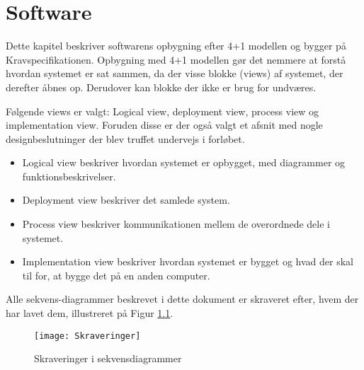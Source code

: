 \documentclass[Main]{subfiles}
\begin{document}
\chapter{Software}
Dette kapitel beskriver softwarens opbygning efter 4+1 modellen\cite[p. 872-875]{Larman} og bygger på Kravspecifikationen\cite{KravSpec}. 
Opbygning med 4+1 modellen gør det nemmere at forstå hvordan systemet er sat sammen, da der visse blokke (views) af systemet, der derefter åbnes op.
Derudover kan blokke der ikke er brug for undværes.

Følgende views er valgt:
Logical view, deployment view, process view og implementation view.
Foruden disse er der også valgt et afsnit med nogle designbeslutninger der blev truffet undervejs i forløbet.
\begin{itemize}
\item Logical view beskriver hvordan systemet er opbygget, med diagrammer og funktionsbeskrivelser.
\item Deployment view beskriver det samlede system.
\item Process view beskriver kommunikationen mellem de overordnede dele i systemet.
\item Implementation view beskriver hvordan systemet er bygget og hvad der skal til for, at bygge det på en anden computer.
\end{itemize}

Alle sekvens-diagrammer beskrevet i dette dokument er skraveret efter, hvem der har lavet dem, illustreret på Figur \ref{Fig:Skraveringer}.
\begin{figure}[H]
\centering
\texttt{[image: Skraveringer]}
\caption{Skraveringer i sekvensdiagrammer}
\label{Fig:Skraveringer}
\end{figure}




\newpage


\newpage


\newpage


\newpage

\end{document}
